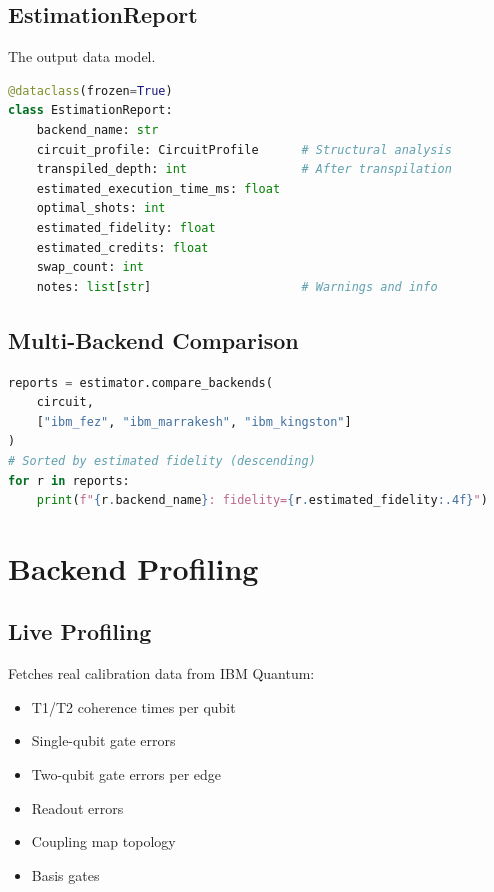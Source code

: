 \documentclass[11pt,a4paper]{article}
\begin{document}
\subsection{EstimationReport}

The output data model.

\begin{lstlisting}[language=Python,caption=EstimationReport Fields]
@dataclass(frozen=True)
class EstimationReport:
    backend_name: str
    circuit_profile: CircuitProfile      # Structural analysis
    transpiled_depth: int                # After transpilation
    estimated_execution_time_ms: float
    optimal_shots: int
    estimated_fidelity: float
    estimated_credits: float
    swap_count: int
    notes: list[str]                     # Warnings and info
\end{lstlisting}

\subsection{Multi-Backend Comparison}

\begin{lstlisting}[language=Python,caption=Comparing Multiple Backends]
reports = estimator.compare_backends(
    circuit,
    ["ibm_fez", "ibm_marrakesh", "ibm_kingston"]
)
# Sorted by estimated fidelity (descending)
for r in reports:
    print(f"{r.backend_name}: fidelity={r.estimated_fidelity:.4f}")
\end{lstlisting}

\section{Backend Profiling}

\subsection{Live Profiling}

Fetches real calibration data from IBM Quantum:

\begin{itemize}[leftmargin=2em]
    \item T1/T2 coherence times per qubit
    \item Single-qubit gate errors
    \item Two-qubit gate errors per edge
    \item Readout errors
    \item Coupling map topology
    \item Basis gates
\end{itemize}
\end{document}
